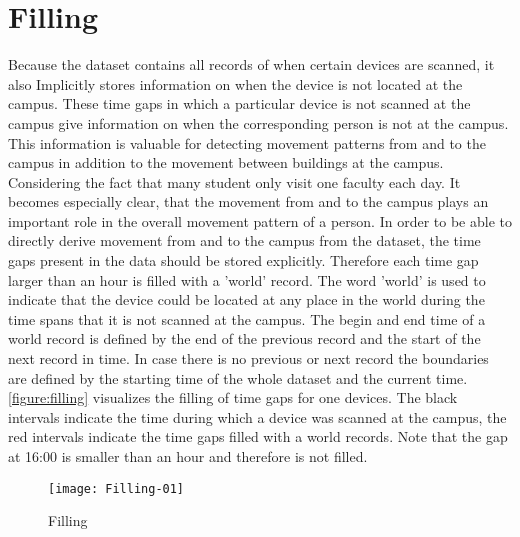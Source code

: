 \section{Filling}\label{filling}
Because the dataset contains all records of when certain devices are scanned, it also Implicitly stores information on when the device is not located at the campus. These time gaps in which a particular device is not scanned at the campus give information on when the corresponding person is not at the campus. This information is valuable for detecting movement patterns from and to the campus in addition to the movement between buildings at the campus. Considering the fact that many student only visit one faculty each day. It becomes especially clear, that the movement from and to the campus plays an important role in the overall movement pattern of a person. In order to be able to directly derive movement from and to the campus from the dataset, the time gaps present in the data should be stored explicitly. Therefore each time gap larger than an hour is filled with a 'world' record. The word 'world' is used to indicate that the device could be located at any place in the world during the time spans that it is not scanned at the campus. The begin and end time of a world record is defined by the end of the previous record and the start of the next record in time. In case there is no previous or next record the boundaries are defined by the starting time of the whole dataset and the current time. \autoref{figure:filling} visualizes the filling of time gaps for one devices. The black intervals indicate the time during which a device was scanned at the campus, the red intervals indicate the time gaps filled with a world records. Note that the gap at 16:00  is smaller than an hour and therefore is not filled.
\begin{figure}[H]
\centering
\texttt{[image: Filling-01]}
\captionsetup{justification=centering}
\caption{Filling}
\label{figure:filling}
\end{figure}


